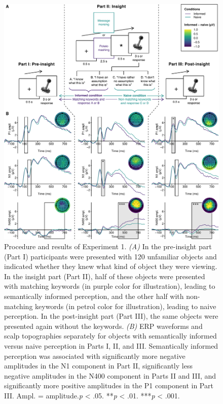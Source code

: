 \documentclass[
  english,
  man,11pt,floatsintext]{apa7}
\begin{document}
\begin{figure}

{\centering \includegraphics{manuscript_files/figure-latex/exp1-plot-1} 

}

\caption{Procedure and results of Experiment 1. \emph{(A)} In the pre-insight part (Part I) participants were presented with 120 unfamiliar objects and indicated whether they knew what kind of object they were viewing. In the insight part (Part II), half of these objects were presented with matching keywords (in purple color for illustration), leading to semantically informed perception, and the other half with non-matching keywords (in petrol color for illustration), leading to naive perception. In the post-insight part (Part III), the same objects were presented again without the keywords. \emph{(B)} ERP waveforms and scalp topographies separately for objects with semantically informed versus naive perception in Parts I, II, and III. Semantically informed perception was associated with significantly more negative amplitudes in the N1 component in Part II, significantly less negative amplitudes in the N400 component in Parts II and III, and significantly more positive amplitudes in the P1 component in Part III. Ampl. = amplitude.\newline*\emph{p} \textless{} .05. **\emph{p} \textless{} .01. ***\emph{p} \textless{} .001.}\label{fig:exp1-plot}
\end{figure}
\end{document}
